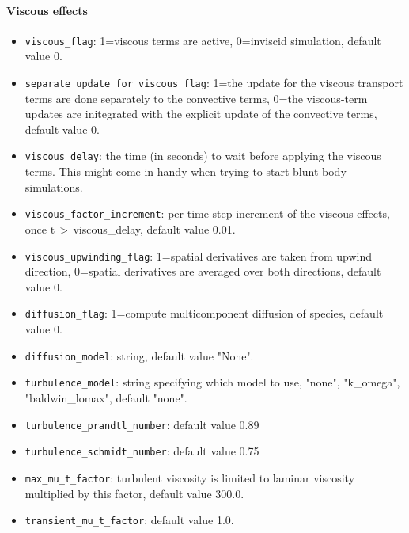 \paragraph{Viscous effects}
\begin{itemize}
\item \texttt{viscous\_flag}: 1=viscous terms are active, 0=inviscid
  simulation, default value 0.
\item \texttt{separate\_update\_for\_viscous\_flag}\ddag: 1=the update 
  for the viscous transport terms are done separately to the convective terms,
  0=the viscous-term updates are initegrated with the explicit update of the convective terms,
  default value 0.
\item \texttt{viscous\_delay}: the time (in seconds) to wait before applying
  the viscous terms.
  This might come in handy when trying to start blunt-body simulations.
\item \texttt{viscous\_factor\_increment}: per-time-step increment of the viscous effects, once
  t\,$>$\,viscous\_delay, default value 0.01.
\item \texttt{viscous\_upwinding\_flag}: 1=spatial derivatives are taken from upwind direction, 0=spatial derivatives are averaged over both directions, default value 0.
\item \texttt{diffusion\_flag}: 1=compute multicomponent diffusion of species, default value 0.
\item \texttt{diffusion\_model}: string, default value "None".
\item \texttt{turbulence\_model}: string specifying which model to use, "none", "k\_omega", "baldwin\_lomax",
  default "none".
\item \texttt{turbulence\_prandtl\_number}: default value 0.89
\item \texttt{turbulence\_schmidt\_number}: default value 0.75
\item \texttt{max\_mu\_t\_factor}: turbulent viscosity is limited to laminar viscosity multiplied
  by this factor, default value 300.0. 
\item \texttt{transient\_mu\_t\_factor}: default value 1.0.
\end{itemize}

